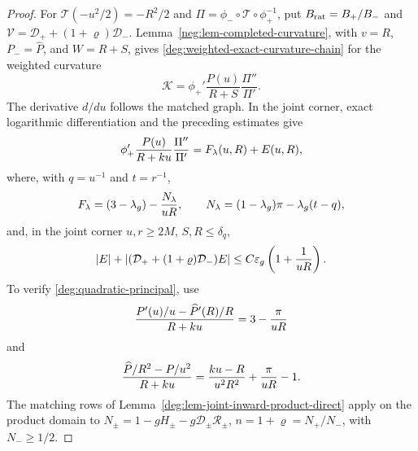 \begin{proof}
For \(\mathcal T(-u^2/2)=-R^2/2\) and
\(\Pi=\phi_-\circ\mathcal T\circ\phi_+^{-1}\), put
\(B_{\rm rat}=B_+/B_-\) and
\(\mathcal V=\mathcal D_++(1+\varrho)\mathcal D_-\).
Lemma~\ref{neg:lem-completed-curvature}, with
\(v=R\), \(P_-=\widehat P\), and \(W=R+S\), gives
\eqref{deg:weighted-exact-curvature-chain} for the weighted curvature
\begin{equation}
 \mathscr K=\phi_+'\frac{P(u)}{R+S}\frac{\Pi''}{\Pi'}.
 \label{deg:quadratic-full-chain}
\end{equation}
The derivative \(d/du\) follows the matched graph.  In the joint
corner, exact logarithmic differentiation and the preceding estimates
give
\begin{equation}
 \phi_+'{P(u)\over R+ku}{\Pi''\over\Pi'}
 =F_\lambda(u,R)+E(u,R),
 \label{deg:quadratic-curvature}
\end{equation}
where, with \(q=u^{-1}\) and \(t=r^{-1}\),
\begin{equation}
 F_\lambda=(3-\lambda_g)-{N_\lambda\over uR},\qquad
 N_\lambda=(1-\lambda_g)\pi-\lambda_g(t-q),
 \label{deg:quadratic-principal}
\end{equation}
and, in the joint corner \(u,r\ge2M\), \(S,R\le\delta_q\),
\begin{equation}
 |E|+|(\mathcal D_++(1+\varrho)\mathcal D_-)E|
 \le C\varepsilon_g\left(1+{1\over uR}\right).
 \label{deg:quadratic-error}
\end{equation}
To verify \eqref{deg:quadratic-principal}, use
\[
 {P'(u)/u-\widehat P'(R)/R\over R+ku}=3-{\pi\over uR}
\]
and
\[
 {\widehat P/R^2-P/u^2\over R+ku}
 ={ku-R\over u^2R^2}+{\pi\over uR}-1.
\]
The matching rows of Lemma~\ref{deg:lem-joint-inward-product-direct}
apply on the product domain to
\(N_\pm=1-gH_\pm-g\mathcal D_\pm\mathcal R_\pm\),
\(n=1+\varrho=N_+/N_-\), with \(N_-\ge1/2\).


\end{proof}
